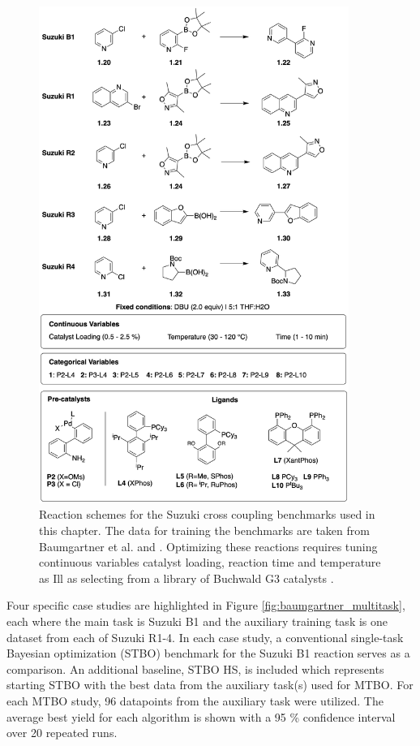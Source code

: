\begin{figure}
    \centering
    \includegraphics[width=0.9\textwidth]{gfx/Chapter03/suzuki_benchmarks_thesis.png}
    \caption{Reaction schemes for the Suzuki cross coupling benchmarks used in this chapter. The data for training the benchmarks are taken from Baumgartner et al. \cite{Baumgartner2018} and \cite{Reizman2016b}. Optimizing these reactions requires tuning continuous variables catalyst loading, reaction time and temperature as Ill as selecting from a library of Buchwald G3 catalysts \cite{Bruno2013}.}
    \label{fig:benchmarks_suzuki}
\end{figure}

Four specific case studies are highlighted in Figure \ref{fig:baumgartner_multitask}, each where the main task is Suzuki B1 and the auxiliary training task is one dataset from each of Suzuki R1-4. In each case study, a conventional single-task Bayesian optimization (STBO) benchmark for the Suzuki B1 reaction serves as a comparison.  An additional baseline, STBO HS, is included which represents starting STBO with the best data from the auxiliary task(s) used for MTBO. For each MTBO study, 96 datapoints from the auxiliary task were utilized. The average best yield for each algorithm is shown with a 95 \% confidence interval over 20 repeated runs. 

